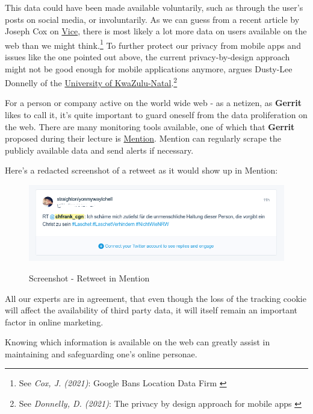 This data could have been made available voluntarily, such as through the user's posts on social media, or involuntarily. As we can guess from a recent article by Joseph Cox on \href{https://www.vice.com/en}{Vice}, there is most likely a lot more data on users available on the web than we might think.\footnote{See \textit{Cox, J. (2021)}: Google Bans Location Data Firm \cite{locationBan}} To further protect our privacy from mobile apps and issues like the one pointed out above, the current privacy-by-design approach might not be good enough for mobile applications anymore, argues Dusty-Lee Donnelly of the \href{https://ukzn.ac.za/}{University of KwaZulu-Natal}.\footnote{See \textit{Donnelly, D. (2021)}: The privacy by design approach for mobile apps \cite{privacyDesign}}

For a person or company active on the world wide web - as a netizen, as \textbf{Gerrit} likes to call it, it's quite important to guard oneself from the data proliferation on the web. There are many monitoring tools available, one of which that \textbf{Gerrit} proposed during their lecture is \href{https://mention.com/en/}{Mention}. Mention can regularly scrape the publicly available data and send alerts if necessary. 

Here's a redacted screenshot of a retweet as it would show up in Mention:

\begin{figure}[H]
\centering
\caption {Screenshot - Retweet in Mention}
\includegraphics[width=\linewidth]{images/retweet-mention.png}
\label{fig:retweet}
\end{figure}

All our experts are in agreement, that even though the loss of the tracking cookie will affect the availability of third party data, it will itself remain an important factor in online marketing. 

Knowing which information is available on the web can greatly assist in maintaining and safeguarding one's online personae.
